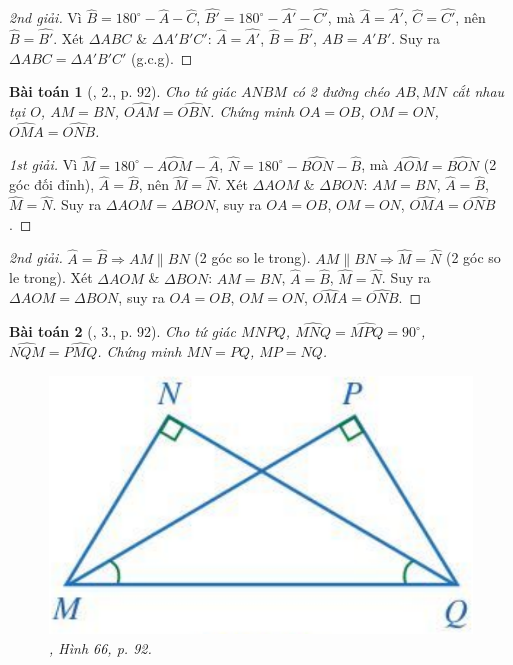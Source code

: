 \documentclass{article}
\newtheorem{baitoan}{Bài toán}
\begin{document}
\begin{proof}[2nd giải]
	Vì $\widehat{B} = 180^\circ - \widehat{A} - \widehat{C}$, $\widehat{B'} = 180^\circ - \widehat{A'} - \widehat{C'}$, mà $\widehat{A} = \widehat{A'}$, $\widehat{C} = \widehat{C'}$, nên $\widehat{B} = \widehat{B'}$. Xét $\Delta ABC$ \& $\Delta A'B'C'$: $\widehat{A} = \widehat{A'}$, $\widehat{B} = \widehat{B'}$, $AB = A'B'$. Suy ra $\Delta ABC = \Delta A'B'C'$ (g.c.g).
\end{proof}

\begin{baitoan}[\cite{SGK_Toan_7_Canh_Dieu_tap_2}, 2., p. 92]
	Cho tứ giác $ANBM$ có 2 đường chéo $AB,MN$ cắt nhau tại $O$, $AM = BN$, $\widehat{OAM} = \widehat{OBN}$. Chứng minh $OA = OB$, $OM = ON$, $\widehat{OMA} = \widehat{ONB}$.
\end{baitoan}

\begin{proof}[1st giải]
	Vì $\widehat{M} = 180^\circ - \widehat{AOM} - \widehat{A}$, $\widehat{N} = 180^\circ - \widehat{BON} - \widehat{B}$, mà $\widehat{AOM} = \widehat{BON}$ (2 góc đối đỉnh), $\widehat{A} = \widehat{B}$, nên $\widehat{M} = \widehat{N}$. Xét $\Delta AOM$ \& $\Delta BON$: $AM = BN$, $\widehat{A} = \widehat{B}$, $\widehat{M} = \widehat{N}$. Suy ra $\Delta AOM = \Delta BON$, suy ra $OA = OB$, $OM = ON$, $\widehat{OMA} = \widehat{ONB}$.
\end{proof}

\begin{proof}[2nd giải]
	$\widehat{A} = \widehat{B}\Rightarrow AM\parallel BN$ (2 góc so le trong). $AM\parallel BN\Rightarrow\widehat{M} = \widehat{N}$ (2 góc so le trong). Xét $\Delta AOM$ \& $\Delta BON$: $AM = BN$, $\widehat{A} = \widehat{B}$, $\widehat{M} = \widehat{N}$. Suy ra $\Delta AOM = \Delta BON$, suy ra $OA = OB$, $OM = ON$, $\widehat{OMA} = \widehat{ONB}$.
\end{proof}

\begin{baitoan}[\cite{SGK_Toan_7_Canh_Dieu_tap_2}, 3., p. 92]
	Cho tứ giác $MNPQ$, $\widehat{MNQ} = \widehat{MPQ} = 90^\circ$, $\widehat{NQM} = \widehat{PMQ}$. Chứng minh $MN = PQ$, $MP = NQ$.
	\begin{figure}[H]
		\centering
		\includegraphics[scale=0.15]{66}
		\caption{\cite{SGK_Toan_7_Canh_Dieu_tap_2}, Hình 66, p. 92.}
	\end{figure}
\end{baitoan}
\end{document}
